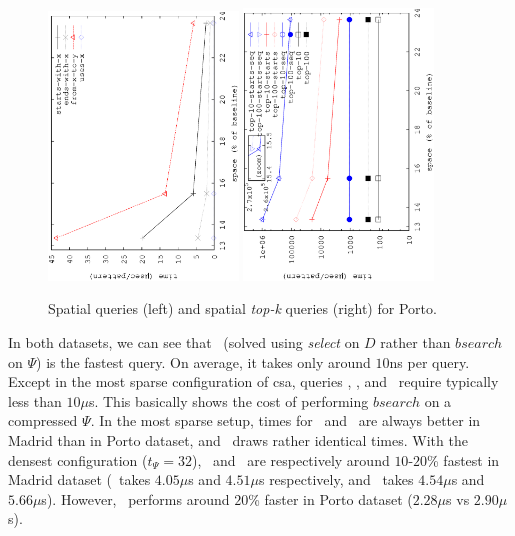 \begin{figure}[htb]
		\begin{center}
			{\includegraphics[angle=-90,width=0.45\textwidth]{figures_synt/porto_spatial.eps}}
			{\includegraphics[angle=-90,width=0.45\textwidth]{figures_synt/porto_spatial_topk.eps}}
		\end{center}
		\vspace{-0.3cm}
		\caption{Spatial queries (left) and spatial {\em top-k} queries (right) for Porto.}
		\label{fig:portosp}
	\end{figure}

	In both datasets, we can see that \Sux\ (solved using {\em select} on $D$ rather than
	$bsearch$ on $\Psi$) is the fastest query. On average, it takes only around $10$ns
	per query. Except in the most sparse configuration of \gls{csa}, queries \Sewx, \Sswx, and 
	\Sfxty\ require typically less than $10\mu$s. This basically shows the cost of performing
	$bsearch$ on a compressed $\Psi$. In the most sparse setup, times for \Sswx\ and \Sfxty\ are always better 
	in Madrid than in Porto dataset, and \Sewx\ draws rather identical times.
	With the densest configuration  ($t_{\Psi}=32$), \Sewx\ and \Sfxty\ are respectively 
	around $10$-$20$\% fastest in Madrid dataset (\Sewx\ takes $4.05\mu$s and $4.51\mu$s respectively, and
	\Sfxty\ takes $4.54\mu$s and $5.66\mu$s). However, \Sswx\ performs around $20$\% faster in Porto dataset 
	($2.28\mu$s vs $2.90\mu$s).
	\medskip


